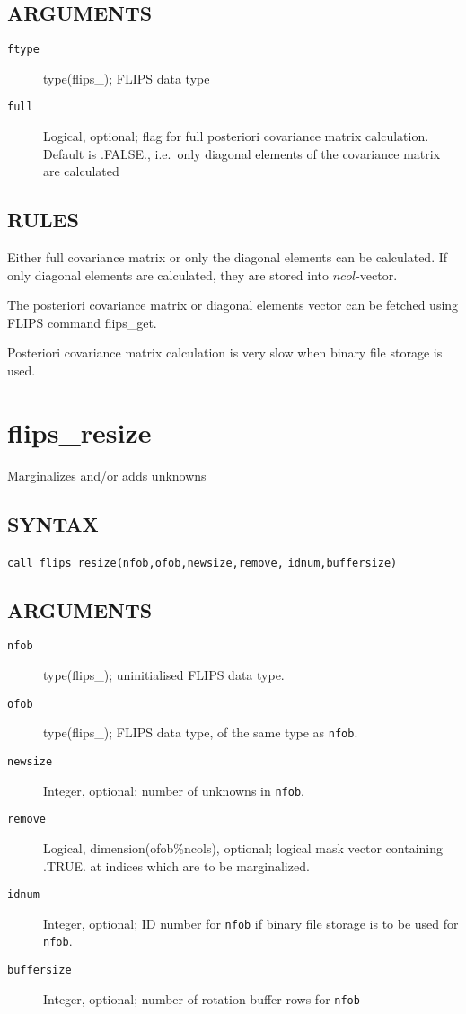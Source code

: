 \documentclass[a4paper,twoside]{refrep}
\newcommand{\code}[1]{{\tt #1}}
\newcommand{\aitem}[1]{\item[{\tt #1}]}
\newenvironment{arglist}
	{\begin{description}}
	{\end{description}}
\begin{document}
\subsection*{ARGUMENTS}
\begin{arglist}
\aitem{ftype} type(flips\_<s|d|c|z>); FLIPS data type
\aitem{full} Logical, optional; flag for full posteriori covariance matrix calculation. Default is .FALSE., i.e.\ only diagonal elements of the covariance matrix are calculated
\end{arglist}

\subsection*{RULES}

Either full covariance matrix or only the diagonal elements can be calculated. If only diagonal elements are calculated, they are stored into $ncol$-vector.

\seealso{\ref{flipsget}} The posteriori covariance matrix or diagonal elements vector can be fetched using FLIPS command flips\_get.

\attention Posteriori covariance matrix calculation is very slow when binary file storage is used.

\newpage
\section{flips\_resize}
Marginalizes and/or adds unknowns

\subsection*{SYNTAX}
\code{call flips\_resize(nfob,ofob,newsize,remove,}\newline
\code{\phantom{call flips\_resize(}idnum,buffersize)}

\subsection*{ARGUMENTS}
\begin{arglist}
\aitem{nfob} type(flips\_<s|d|c|z>); uninitialised FLIPS data type.
\aitem{ofob}type(flips\_<s|d|c|z>); FLIPS data type, of the same type as \code{nfob}.
\aitem{newsize} Integer, optional; number of unknowns in \code{nfob}.
\aitem{remove} Logical, dimension(ofob\%ncols), optional; logical mask vector containing .TRUE. at indices which are to be marginalized.
\aitem{idnum} Integer, optional; ID number for \code{nfob} if binary file storage is to be used for \code{nfob}.
\aitem{buffersize} Integer, optional; number of rotation buffer rows for \code{nfob}
\end{arglist}
\end{document}
